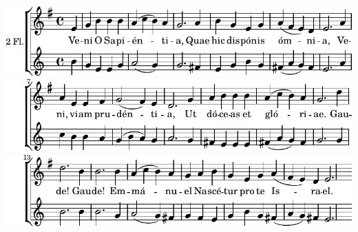 \includegraphics{8b0817629160de9cb3277f8ce9fdfdf1-1}%
\ifx\betweenLilyPondSystem \undefined
  \linebreak
\else
  \expandafter{}%
\fi
\includegraphics{8b0817629160de9cb3277f8ce9fdfdf1-2}%
\ifx\betweenLilyPondSystem \undefined
  \linebreak
\else
  \expandafter{}%
\fi
\includegraphics{8b0817629160de9cb3277f8ce9fdfdf1-3}%
